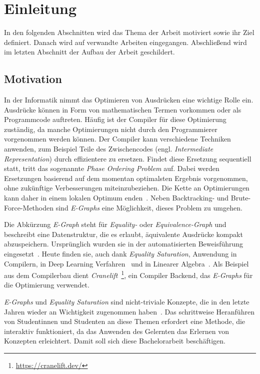 \section{Einleitung}\label{sec:einleitung}

In den folgenden Abschnitten wird das Thema der Arbeit motiviert sowie ihr Ziel definiert.
Danach wird auf verwandte Arbeiten eingegangen.
Abschließend wird im letzten Abschnitt der Aufbau der Arbeit geschildert.

\subsection{Motivation}

\noindent In der Informatik nimmt das Optimieren von Ausdrücken eine wichtige Rolle ein. 
Ausdrücke können in Form von mathematischen Termen vorkommen oder als Programmcode auftreten.
Häufig ist der Compiler für diese Optimierung zuständig, da manche Optimierungen nicht durch den Programmierer vorgenommen werden können. 
Der Compiler kann verschiedene Techniken anwenden, zum Beispiel Teile des Zwischencodes (engl. \textit{Intermediate Representation}) durch effizientere zu ersetzen.
Findet diese Ersetzung sequentiell statt, tritt das sogenannte \textit{Phase Ordering Problem} auf. 
Dabei werden Ersetzungen basierend auf dem momentan optimalsten Ergebnis vorgenommen, ohne zukünftige Verbesserungen miteinzubeziehen.
Die Kette an Optimierungen kann daher in einem lokalen Optimum enden~\cite{phaseorder-2009}.
Neben Backtracking- und Brute-Force-Methoden sind \textit{E-Graphs} eine Möglichkeit, dieses Problem zu umgehen. 

\noindent Die Abkürzung \textit{E-Graph} steht für \textit{Equality-} oder \textit{Equivalence-Graph} und beschreibt eine Datenstruktur, die es
erlaubt, äquivalente Ausdrücke kompakt abzuspeichern.
Ursprünglich wurden sie in der automatisierten Beweisführung eingesetzt~\cite{2021-egg}. Heute finden sie, auch dank \textit{Equality Saturation}, Anwendung in Compilern, in 
Deep Learning Verfahren~\cite{yang2021} und in Linearer Algebra~\cite{wang2020}.
Als Beispiel aus dem Compilerbau dient \textit{Cranelift}~\footnote{\hspace{1.5mm}\url{https://cranelift.dev/}}, ein Compiler Backend, das \textit{E-Graphs} für die Optimierung verwendet.

\noindent \textit{E-Graphs} und \textit{Equality Saturation} sind nicht-triviale Konzepte, die in den letzte Jahren wieder an Wichtigkeit zugenommen haben~\cite[S.~2]{eqsatexploration}.
Das schrittweise Heranführen von Studentinnen und Studenten an diese Themen erfordert eine Methode, die interaktiv funktioniert, da das Anwenden des Gelernten 
das Erlernen von Konzepten erleichtert. Damit soll sich diese Bachelorarbeit beschäftigen. 

